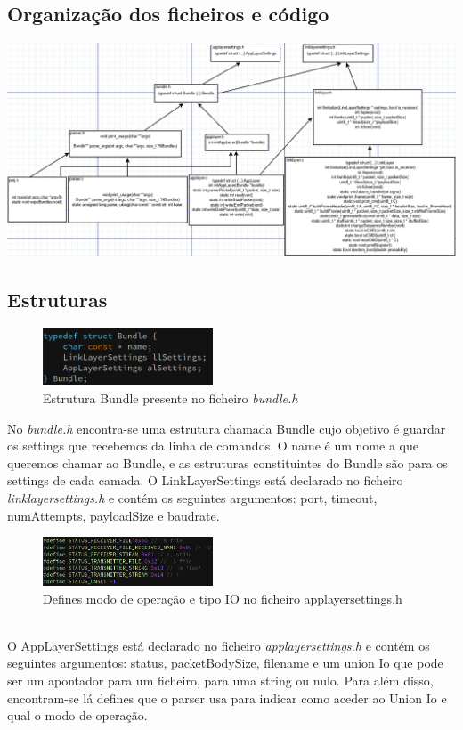 \documentclass[a4paper]{article}
\begin{document}
\subsection{Organização dos ficheiros e código}
\centerline{\includegraphics[scale=0.70]{organizacaoFicheirosECodigo.png}}

\subsection{Estruturas}
\begin{figure}[h]
    \centering
    \includegraphics[width=0.45\textwidth]{bundleStruct.png}
    \caption{Estrutura Bundle presente no ficheiro \textit{bundle.h}}
\end{figure}
No \textit{bundle.h} encontra-se uma estrutura chamada Bundle cujo objetivo é
guardar os settings que recebemos da linha de comandos. O name é um nome a que
queremos chamar ao Bundle, e as estruturas constituintes do Bundle são para os
settings de cada camada. O LinkLayerSettings está declarado no ficheiro
\textit{linklayersettings.h} e contém os seguintes argumentos: port, timeout,
numAttempts, payloadSize e baudrate.
\begin{figure}[h]
\centering
    \includegraphics[width=0.45\textwidth]{status.png}
    \caption{Defines modo de operação e tipo IO no ficheiro
    applayersettings.h}
\end{figure}\\
O AppLayerSettings está declarado no ficheiro \textit{applayersettings.h} e
contém os seguintes argumentos: status, packetBodySize, filename e um union Io
que pode ser um apontador para um ficheiro, para uma string ou nulo. Para além
disso, encontram-se lá defines que o parser usa para indicar como aceder ao
Union Io e qual o modo de operação.\\\newline
\end{document}
